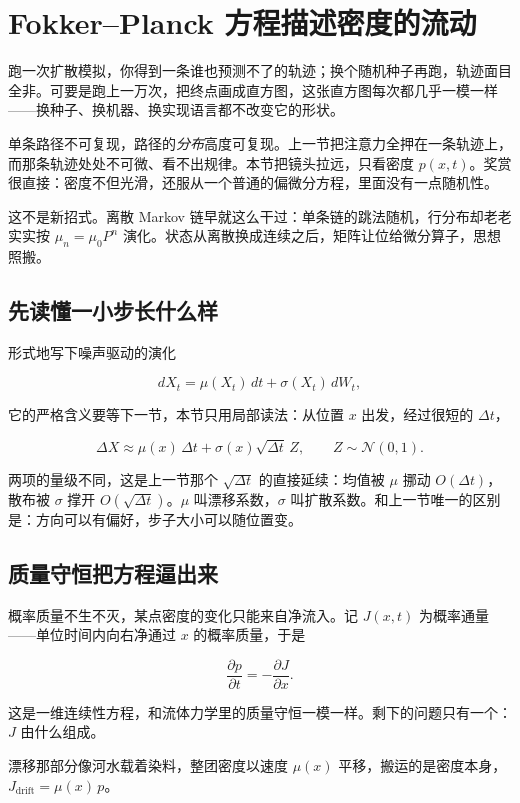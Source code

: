 \section{Fokker--Planck 方程描述密度的流动}
\label{sec:06-Random-Processes/06-Diffusion-and-SDE/02}

跑一次扩散模拟，你得到一条谁也预测不了的轨迹；换个随机种子再跑，轨迹面目全非。可要是跑上一万次，把终点画成直方图，这张直方图每次都几乎一模一样——换种子、换机器、换实现语言都不改变它的形状。

单条路径不可复现，路径的\emph{分布}高度可复现。上一节把注意力全押在一条轨迹上，而那条轨迹处处不可微、看不出规律。本节把镜头拉远，只看密度 \(p(x,t)\)。奖赏很直接：密度不但光滑，还服从一个普通的偏微分方程，里面没有一点随机性。

这不是新招式。离散 Markov 链早就这么干过：单条链的跳法随机，行分布却老老实实按 \(\mu_n=\mu_0P^n\) 演化。状态从离散换成连续之后，矩阵让位给微分算子，思想照搬。

\subsection{先读懂一小步长什么样}

形式地写下噪声驱动的演化

\[
dX_t=\mu(X_t)\,dt+\sigma(X_t)\,dW_t,
\]

它的严格含义要等下一节，本节只用局部读法：从位置 \(x\) 出发，经过很短的 \(\Delta t\)，

\[
\Delta X\approx\mu(x)\,\Delta t+\sigma(x)\sqrt{\Delta t}\,Z,
\qquad Z\sim\mathcal N(0,1).
\]

两项的量级不同，这是上一节那个 \(\sqrt{\Delta t}\) 的直接延续：均值被 \(\mu\) 挪动 \(O(\Delta t)\)，散布被 \(\sigma\) 撑开 \(O(\sqrt{\Delta t})\)。\(\mu\) 叫漂移系数，\(\sigma\) 叫扩散系数。和上一节唯一的区别是：方向可以有偏好，步子大小可以随位置变。

\subsection{质量守恒把方程逼出来}

概率质量不生不灭，某点密度的变化只能来自净流入。记 \(J(x,t)\) 为概率通量——单位时间内向右净通过 \(x\) 的概率质量，于是

\[
\frac{\partial p}{\partial t}=-\frac{\partial J}{\partial x}.
\]

这是一维连续性方程，和流体力学里的质量守恒一模一样。剩下的问题只有一个：\(J\) 由什么组成。

漂移那部分像河水载着染料，整团密度以速度 \(\mu(x)\) 平移，搬运的是密度本身，\(J_{\mathrm{drift}}=\mu(x)\,p\)。

